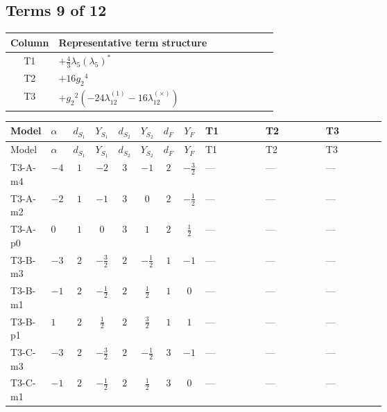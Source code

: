 \documentclass[8pt]{article}
\begin{document}
\begin{landscape}
\subsection*{Terms 9 of 12}
\begin{center}
\begin{tabular}{@{}c >{\raggedright\arraybackslash}p{0.82\linewidth}@{}}
\toprule
Column & Representative term structure \\
\midrule
T1 & \(\displaystyle +\frac{4}{3} {\lambda_5} \left({\lambda_5}\right)^{*}\) \\
\midrule
T2 & \(\displaystyle +16 {g_2}^4\) \\
\midrule
T3 & \(\displaystyle +{g_2}^2 (-24 {\lambda_{12}^{(1)}}-16 {\lambda_{12}^{(\times)}})\) \\
\midrule
\bottomrule
\end{tabular}
\end{center}
\smallskip
\tiny
\begin{longtable}{@{}llcccccc >{\raggedright\arraybackslash}p{0.21\linewidth} >{\raggedright\arraybackslash}p{0.21\linewidth} >{\raggedright\arraybackslash}p{0.21\linewidth}@{}}
\toprule
Model & $\alpha$ & $d_{S_1}$ & $Y_{S_1}$ & $d_{S_2}$ & $Y_{S_2}$ & $d_F$ & $Y_F$ & T1 & T2 & T3 \\
\midrule
\endfirsthead
\toprule
Model & $\alpha$ & $d_{S_1}$ & $Y_{S_1}$ & $d_{S_2}$ & $Y_{S_2}$ & $d_F$ & $Y_F$ & T1 & T2 & T3 \\
\midrule
\endhead
T3-A-m4 & $-4$ & $1$ & $-2$ & $3$ & $-1$ & $2$ & $-\frac{3}{2}$ & --- & --- & --- \\
\midrule
T3-A-m2 & $-2$ & $1$ & $-1$ & $3$ & $0$ & $2$ & $-\frac{1}{2}$ & --- & --- & --- \\
\midrule
T3-A-p0 & $0$ & $1$ & $0$ & $3$ & $1$ & $2$ & $\frac{1}{2}$ & --- & --- & --- \\
\midrule
T3-B-m3 & $-3$ & $2$ & $-\frac{3}{2}$ & $2$ & $-\frac{1}{2}$ & $1$ & $-1$ & --- & --- & --- \\
\midrule
T3-B-m1 & $-1$ & $2$ & $-\frac{1}{2}$ & $2$ & $\frac{1}{2}$ & $1$ & $0$ & --- & --- & --- \\
\midrule
T3-B-p1 & $1$ & $2$ & $\frac{1}{2}$ & $2$ & $\frac{3}{2}$ & $1$ & $1$ & --- & --- & --- \\
\midrule
T3-C-m3 & $-3$ & $2$ & $-\frac{3}{2}$ & $2$ & $-\frac{1}{2}$ & $3$ & $-1$ & --- & --- & --- \\
\midrule
T3-C-m1 & $-1$ & $2$ & $-\frac{1}{2}$ & $2$ & $\frac{1}{2}$ & $3$ & $0$ & --- & --- & --- \\

\end{longtable}
\end{landscape}
\end{document}
